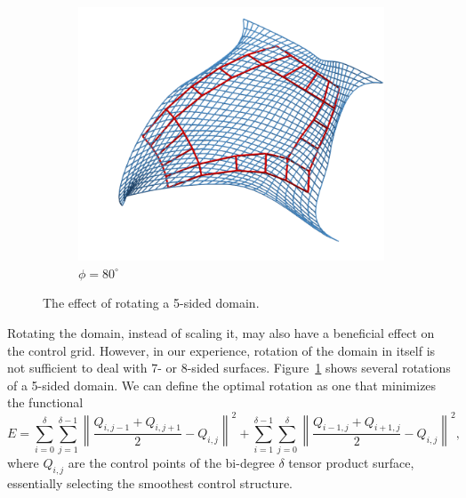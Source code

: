 \documentclass[9pt,academicons]{article}
\begin{document}
\begin{figure}[!ht]
{\begin{subfigure}{.26\textwidth}
      \centering
      \includegraphics[width=\textwidth]{images/rotations/80.png}
      \caption{$\phi=80^\circ$}
    \end{subfigure}
    \hfill
  }

  \caption{The effect of rotating a 5-sided domain.}
  \label{fig:rotations}
\end{figure}
Rotating the domain, instead of scaling it, may also have a beneficial effect
on the control grid. However, in our experience, rotation of the domain in itself
is not sufficient to deal with 7- or 8-sided surfaces.
Figure~\ref{fig:rotations} shows several rotations of a 5-sided domain.
We can define the optimal rotation as one that minimizes the functional
\begin{equation}
  E = \sum_{i=0}^\delta\sum_{j=1}^{\delta-1}\left\|\frac{Q_{i,j-1}+Q_{i,j+1}}{2}-Q_{i,j}\right\|^2 +
  \sum_{i=1}^{\delta-1}\sum_{j=0}^\delta\left\|\frac{Q_{i-1,j}+Q_{i+1,j}}{2}-Q_{i,j}\right\|^2,
\end{equation}
where $Q_{i,j}$ are the control points of the bi-degree $\delta$ tensor product surface,
essentially selecting the smoothest control structure.
\end{document}
